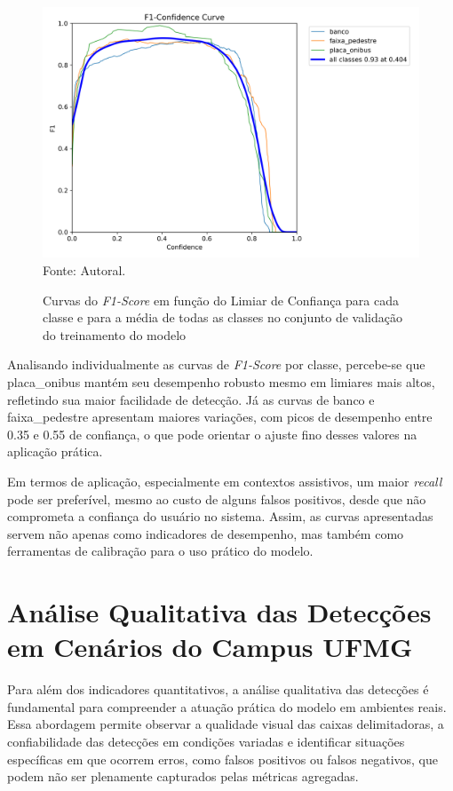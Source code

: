 \begin{figure}[htbp]
  \centering
  \caption{Curvas do \textit{F1-Score} em função do Limiar de Confiança para cada classe e para a média de todas as classes no conjunto de validação do treinamento do modelo}
  \includegraphics[width=1\textwidth]{Figuras/F1_curve.png}
  \\
  Fonte: Autoral.
  \label{fg-f1_curve}
\end{figure}

Analisando individualmente as curvas de \textit{F1-Score} por classe, percebe-se que placa\_onibus mantém seu desempenho robusto mesmo em limiares mais altos, refletindo sua maior facilidade de detecção. Já as curvas de banco e faixa\_pedestre apresentam maiores variações, com picos de desempenho entre 0.35 e 0.55 de confiança, o que pode orientar o ajuste fino desses valores na aplicação prática.

Em termos de aplicação, especialmente em contextos assistivos, um maior \textit{recall} pode ser preferível, mesmo ao custo de alguns falsos positivos, desde que não comprometa a confiança do usuário no sistema. Assim, as curvas apresentadas servem não apenas como indicadores de desempenho, mas também como ferramentas de calibração para o uso prático do modelo.

\section{\textbf{Análise Qualitativa das Detecções em Cenários do Campus UFMG}}

Para além dos indicadores quantitativos, a análise qualitativa das detecções é fundamental para compreender a atuação prática do modelo em ambientes reais. Essa abordagem permite observar a qualidade visual das caixas delimitadoras, a confiabilidade das detecções em condições variadas e identificar situações específicas em que ocorrem erros, como falsos positivos ou falsos negativos, que podem não ser plenamente capturados pelas métricas agregadas.

